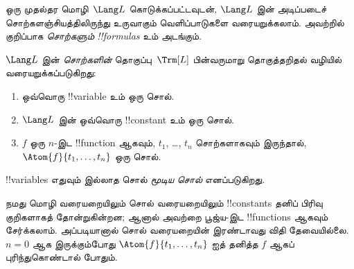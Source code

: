 \documentclass[../../../include/open-logic-section]{subfiles}
\begin{document}


ஒரு முதல்தர மொழி~$\Lang L$ கொடுக்கப்பட்டவுடன், $\Lang L$ இன் அடிப்படைச்
சொற்களஞ்சியத்திலிருந்து உருவாகும் வெளிப்பாடுகளை வரையறுக்கலாம். அவற்றில்
குறிப்பாக \emph{சொற்களும்} \emph{!!{formula}s} உம் அடங்கும்.

\begin{defn}[பதங்கள்]
$\Lang L$ இன் \emph{சொற்களின்} தொகுப்பு~$\Trm[L]$ பின்வருமாறு
தொகுத்தறிதல் வழியில் வரையறுக்கப்படுகிறது:
\begin{enumerate}
\item ஒவ்வொரு !!{variable} உம் ஒரு சொல்.
\item $\Lang L$ இன் ஒவ்வொரு !!{constant} உம் ஒரு சொல்.
\item $f$ ஒரு $n$-இட !!{function} ஆகவும், $t_1$, \dots, $t_n$ சொற்களாகவும்
  இருந்தால், $\Atom{f}{t_1, \ldots, t_n}$ ஒரு சொல்.
\end{enumerate}
!!{variable}s எதுவும் இல்லாத சொல் \emph{மூடிய சொல்} எனப்படுகிறது.
\end{defn}

\begin{explain}
நமது மொழி வரையறையிலும் சொல் வரையறையிலும் !!{constant}s தனிப் பிரிவு
குறிகளாகத் தோன்றுகின்றன; ஆனால் அவற்றை பூஜ்ய-இட !!{function}s ஆகவும்
சேர்க்கலாம். அப்படியானால் சொல் வரையறையின் இரண்டாவது விதி தேவையில்லை.
$n=0$ ஆக இருக்கும்போது $\Atom{f}{t_1, \ldots, t_n}$ ஐத் தனித்த
$f$ ஆகப் புரிந்துகொண்டால் போதும்.
\end{explain}
\end{document}
